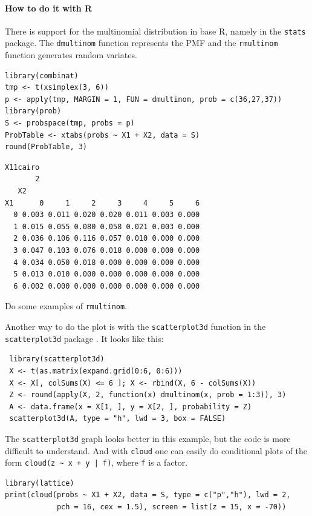 \documentclass[captions=tableheading]{scrbook}
\begin{document}
\paragraph*{How to do it with \textsf{R}}

There is support for the multinomial distribution in base \textsf{R}, namely in the \texttt{stats} package. The \texttt{dmultinom} function represents the PMF and the \texttt{rmultinom} function generates random variates.




\begin{verbatim}
library(combinat)
tmp <- t(xsimplex(3, 6))
p <- apply(tmp, MARGIN = 1, FUN = dmultinom, prob = c(36,27,37))
library(prob)
S <- probspace(tmp, probs = p)
ProbTable <- xtabs(probs ~ X1 + X2, data = S)
round(ProbTable, 3)
\end{verbatim}


\begin{verbatim}
X11cairo 
       2
   X2
X1      0     1     2     3     4     5     6
  0 0.003 0.011 0.020 0.020 0.011 0.003 0.000
  1 0.015 0.055 0.080 0.058 0.021 0.003 0.000
  2 0.036 0.106 0.116 0.057 0.010 0.000 0.000
  3 0.047 0.103 0.076 0.018 0.000 0.000 0.000
  4 0.034 0.050 0.018 0.000 0.000 0.000 0.000
  5 0.013 0.010 0.000 0.000 0.000 0.000 0.000
  6 0.002 0.000 0.000 0.000 0.000 0.000 0.000
\end{verbatim}

Do some examples of \texttt{rmultinom}.

Another way to do the plot is with the \texttt{scatterplot3d} function in the \texttt{scatterplot3d} package \cite{Liggesscatterplot3d}. It looks like this: 
\begin{verbatim}
 library(scatterplot3d)
 X <- t(as.matrix(expand.grid(0:6, 0:6)))
 X <- X[, colSums(X) <= 6 ]; X <- rbind(X, 6 - colSums(X))
 Z <- round(apply(X, 2, function(x) dmultinom(x, prob = 1:3)), 3)
 A <- data.frame(x = X[1, ], y = X[2, ], probability = Z)
 scatterplot3d(A, type = "h", lwd = 3, box = FALSE)
\end{verbatim}
The \texttt{scatterplot3d} graph looks better in this example, but the code is more difficult to understand. And with \texttt{cloud} one can easily do conditional plots of the form \texttt{cloud(z \textasciitilde{} x + y | f)}, where \texttt{f} is a factor.


\begin{verbatim}
library(lattice)
print(cloud(probs ~ X1 + X2, data = S, type = c("p","h"), lwd = 2, 
            pch = 16, cex = 1.5), screen = list(z = 15, x = -70))
\end{verbatim}
\end{document}

